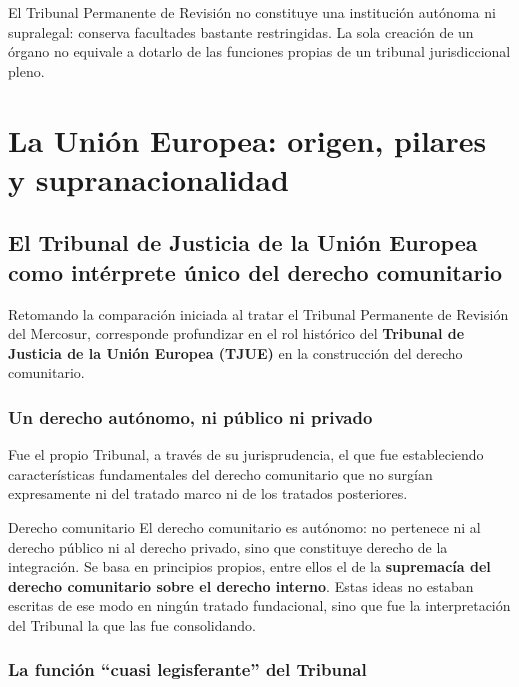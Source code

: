 \documentclass[12pt,oneside]{book}
\begin{document}
\begin{important}
El Tribunal Permanente de Revisión no constituye una institución autónoma ni supralegal: conserva facultades bastante restringidas. La sola creación de un órgano no equivale a dotarlo de las funciones propias de un tribunal jurisdiccional pleno.
\end{important}

\chapter{La Unión Europea: origen, pilares y supranacionalidad}

\section{El Tribunal de Justicia de la Unión Europea como intérprete único del derecho comunitario}

Retomando la comparación iniciada al tratar el Tribunal Permanente de Revisión del Mercosur, corresponde profundizar en el rol histórico del \textbf{Tribunal de Justicia de la Unión Europea (TJUE)} en la construcción del derecho comunitario.

\subsection{Un derecho autónomo, ni público ni privado}

Fue el propio Tribunal, a través de su jurisprudencia, el que fue estableciendo características fundamentales del derecho comunitario que no surgían expresamente ni del tratado marco ni de los tratados posteriores.

\begin{definition}{Derecho comunitario}
El derecho comunitario es autónomo: no pertenece ni al derecho público ni al derecho privado, sino que constituye derecho de la integración. Se basa en principios propios, entre ellos el de la \textbf{supremacía del derecho comunitario sobre el derecho interno}. Estas ideas no estaban escritas de ese modo en ningún tratado fundacional, sino que fue la interpretación del Tribunal la que las fue consolidando.
\end{definition}

\subsection{La función ``cuasi legisferante'' del Tribunal}
\end{document}
